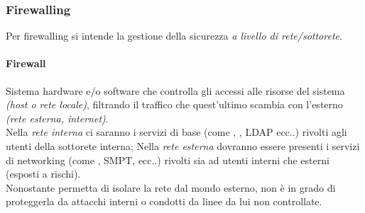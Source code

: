 \documentclass[a4paper,11pt]{article}
\def\subsub#1{\subsubsection{#1}\label{#1}}
\def\vedi#1{\nameref{#1}}
\begin{document}
\subsub{Firewalling}
Per firewalling si intende la gestione della sicurezza \textit{a livello di rete/sottorete}.
\paragraph{Firewall} Sistema hardware e/o software che controlla gli accessi alle risorse del sistema \textit{(host o rete locale)}, filtrando il traffico che quest'ultimo scambia con l'esterno \textit{(rete esterna, internet)}.\\
Nella \textit{rete interna} ci saranno i servizi di base (come \vedi{NFS}, \vedi{NIS}, LDAP ecc..) rivolti agli utenti della sottorete interna; Nella \textit{rete esterna} dovranno essere presenti i servizi di networking (come \vedi{DNS}, SMPT, \vedi{FTP} ecc..) rivolti sia ad utenti interni che esterni (esposti a rischi).\\
Nonostante permetta di isolare la rete dal mondo esterno, non è in grado di proteggerla da attacchi interni o condotti da linee da lui non controllate.
\end{document}
